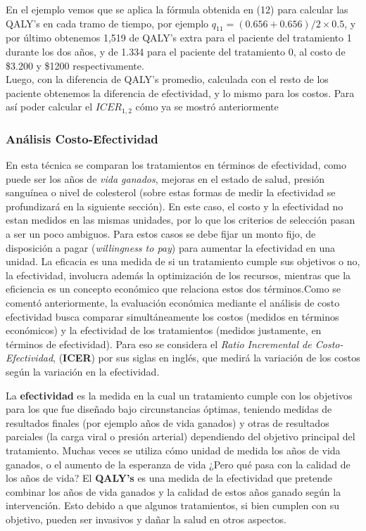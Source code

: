 \documentclass{siep}
\begin{document}
En el ejemplo vemos que se aplica la fórmula obtenida en (12) para calcular las QALY's en cada tramo de tiempo, por ejemplo $q_{11}=(0.656 + 0.656)/2 \times 0.5$, y por último obtenemos 1,519 de QALY's extra para el paciente del tratamiento 1 durante los dos años, y de 1.334 para el paciente del tratamiento 0, al costo de \$3.200 y \$1200 respectivamente.\\
Luego, con la diferencia de QALY's promedio, calculada con el resto de los paciente obtenemos la diferencia de efectividad, y lo mismo para los costos. Para así poder calcular el $ICER_{1,2}$ cómo ya se mostró anteriormente

\subsubsection{Análisis Costo-Efectividad}
\label{sec:ACE}
En esta técnica se comparan los tratamientos en términos de efectividad, como puede ser los años de \emph{vida ganados}, mejoras en el estado de salud, presión sanguínea o nivel de colesterol (sobre estas formas de medir la efectividad se profundizará en la siguiente sección).
En este caso, el costo y la efectividad no estan medidos en las mismas unidades, por lo que los criterios de selección pasan a ser un poco ambiguos. Para estos casos se debe fijar un monto fijo, de disposición a pagar (\emph{willingness to pay}) para aumentar la efectividad en una unidad. La eficacia es una medida de si un tratamiento cumple sus objetivos o no, la efectividad, involucra además la optimización de los recursos, mientras que la eficiencia es un concepto económico que relaciona estos dos términos.Como se comentó anteriormente, la evaluación económica mediante el análisis de costo efectividad busca comparar simultáneamente los costos (medidos en términos económicos) y la efectividad de los tratamientos (medidos justamente, en términos de efectividad). Para eso se considera  el  \textit{Ratio Incremental de Costo-Efectividad}, (\textbf{ICER}) por sus siglas en inglés, que medirá la variación de los costos según la variación en la efectividad.


La \textbf{efectividad} es la medida en la cual un tratamiento cumple con los objetivos para los que fue diseñado bajo circunstancias óptimas, teniendo medidas de resultados finales (por ejemplo años de vida ganados) y otras de resultados parciales (la carga viral o presión arterial) dependiendo del objetivo principal del tratamiento.
Muchas veces se utiliza cómo unidad de medida los años de vida ganados, o el aumento de la esperanza de vida ¿Pero qué pasa con la calidad de los años de vida? El \textbf{QALY's} es una medida de la efectividad que  pretende combinar los años de vida ganados y la calidad de estos años ganado según la intervención. Esto debido a que algunos tratamientos, si bien cumplen con su objetivo, pueden ser invasivos y dañar la salud en otros aspectos.
\end{document}

